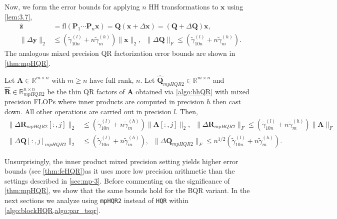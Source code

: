 \documentclass[review,onefignum,onetabnum]{siamart190516}
\newcommand{\R}{\mathbb{R}}
\newcommand{\bb}[1]{\mathbf{#1}}
\newcommand{\fl}{\mathrm{fl}}
\newcommand{\cO}{\mathcal{O}}
\begin{document}
Now, we form the error bounds for applying $n$ HH transformations to $\bb{x}$ using \cref{lem:3.7},
\begin{align}
\hat{\bb{z}} &= \fl(\bb{P}_1\cdots\bb{P}_n\bb{x})=\bb{Q} (\bb{x} +\Delta \bb{x}) = (\bb{Q} + \Delta \bb{Q})\bb{x},\\
\|\Delta \bb{y}\|_2 &\leq (\tilde{\gamma}_{10n}^{(l)}+n\tilde{\gamma}_m^{(h)})\|\bb{x}\|_2,\;\; \|\Delta \bb{Q}\|_F\leq (\tilde{\gamma}_{10n}^{(l)}+n\tilde{\gamma}_m^{(h)}).\label{eqn:mp19.3}
\end{align} 
The analogous mixed precision QR factorization error bounds are shown in \cref{thm:mpHQR}.
\begin{theorem}
	\label{thm:mpHQR}
	Let $\bb{A}\in\R^{m\times n}$ with $m\geq n$ have full rank, $n$. 
	Let $\hat{\bb{Q}}_{mpHQR2}\in\R^{m\times n}$ and $\hat{\bb{R}}\in\R^{n\times n}_{mpHQR2}$ be the thin QR factors of $\bb{A}$ obtained via \cref{algo:hhQR} with mixed precision FLOPs where inner products are computed in precision $h$ then cast down.
	All other operations are carried out in precision $l$.
	Then,
	\begin{align}
	\|\Delta \bb{R}_{mpHQR2}[:,j]\|_2&\leq (\tilde{\gamma}_{10n}^{(l)}+n\tilde{\gamma}_m^{(h)}) \|\bb{A}[:,j]\|_2,\;\; \|\Delta \bb{R}_{mpHQR2}\|_F\leq (\tilde{\gamma}_{10n}^{(l)}+n\tilde{\gamma}_m^{(h)}) \|\bb{A}\|_F \label{eqn:mpHQR2R}\\
	\|\Delta \bb{Q}[:,j]_{mpHQR2}\|_2&\leq (\tilde{\gamma}_{10n}^{(l)}+n\tilde{\gamma}_m^{(h)}),\;\; \|\Delta \bb{Q}_{mpHQR2}\|_F \leq n^{1/2} (\tilde{\gamma}_{10n}^{(l)}+n\tilde{\gamma}_m^{(h)})\label{eqn:mpHQR2Q}.
	\end{align}
\end{theorem}
Unsurprisingly, the inner product mixed precision setting yields higher error bounds (see \cref{thm:feHQR})as it uses more low precision arithmetic than the settings described in \cref{sec:mp-3}. 
Before commenting on the significance of \cref{thm:mpHQR}, we show that the same bounds hold for the BQR variant.
In the next sections we analyze using {\tt mpHQR2} instead of {\tt HQR} within \cref{algo:blockHQR,algo:par_tsqr}.
\end{document}
